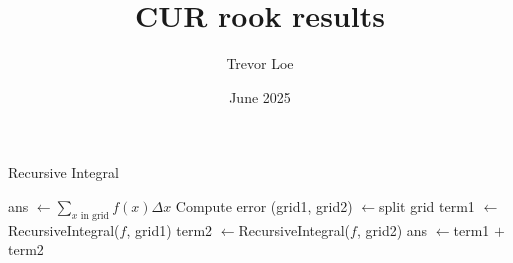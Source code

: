 \documentclass{article}
\title{CUR rook results}
\author{Trevor Loe}
\date{June 2025}
\begin{document}
\maketitle

\section{}
\begin{algorithm}
	\caption{Recursive Integral}
	\begin{algorithmic}[1]
		\State ans $\gets \sum_{x\text{ in grid}} f(x)\Delta x$
		\State Compute error
		\State (grid1, grid2) $\gets $split grid
		\State term1 $\gets $RecursiveIntegral($f$, grid1)
		\State term2 $\gets $RecursiveIntegral($f$, grid2)
		\State ans $\gets $term1 $+$ term2
		\EndIf
		\State {}
		\EndFunction
	\end{algorithmic}
\end{algorithm}
\end{document}
